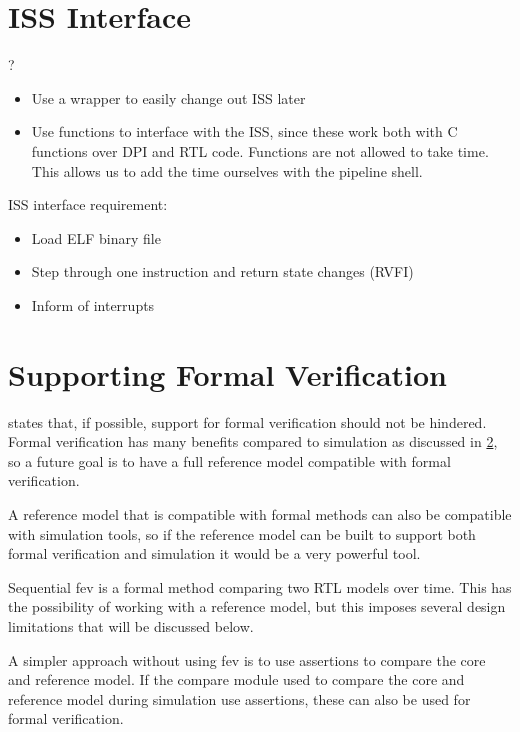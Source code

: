 \section{ISS Interface}

?


\begin{itemize}
    \item Use a wrapper to easily change out ISS later
    \item Use functions to interface with the ISS, since these work both with C functions over DPI and RTL code. Functions are not allowed to take time. This allows us to add the time ourselves with the pipeline shell.
\end{itemize}

ISS interface requirement:

\begin{itemize}
    \item Load ELF binary file \textbf{}
    \item Step through one instruction and return state changes (RVFI)
    \item Inform of interrupts
    
\end{itemize}



\section{Supporting Formal Verification}

 states that, if possible, support for formal verification should not be hindered. Formal verification has many benefits compared to simulation as discussed in \ref{}, so a future goal is to have a full reference model compatible with formal verification.

A reference model that is compatible with formal methods can also be compatible with simulation tools\cite{}, so if the reference model can be built to support both formal verification and simulation it would be a very powerful tool.

Sequential \acrfull{fev} is a formal method comparing two RTL models over time. This has the possibility of working with a reference model, but this imposes several design limitations that will be discussed below.

A simpler approach without using \acrfull{fev} is to use assertions to compare the core and reference model. If the compare module used to compare the core and reference model during simulation use assertions, these can also be used for formal verification.

